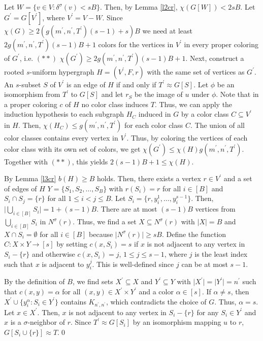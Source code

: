 \begin{prf}
Let $W=\{v\in V:\delta^\sigma (v) <sB\}$. Then, by Lemma \ref{l2cr}, $\chi (G[W]) < 2sB$. Let $G^\prime = G[V^\prime ]$, where $V^\prime = V-W$. Since $\chi (G)\geq 2(g(m^\prime ,n^\prime ,T^\prime )(s-1)+s)B$ we need at least $2g(m^\prime ,n^\prime ,T^\prime )(s-1)B + 1$ colors for the vertices in $V^\prime$ in every proper coloring of $G^\prime$, i.e. $(\ast\ast)$ $\chi (G^\prime )\geq 2g(m^\prime ,n^\prime ,T^\prime )(s-1)B + 1$. Next, construct a rooted $s$-uniform hypergraph $H=(V^\prime ,F,r)$ with the same set of vertices as $G^\prime$. An $s$-subset $S$ of $V^\prime$ is an edge of $H$ if and only if $T^\prime\approx G[S]$. Let $\phi$ be an isomorphism from $T^\prime$ to $G[S]$ and let $r_S$ be the image of $u$ under $\phi$. Note that in a proper coloring $c$ of $H$ no color class induces $T$. Thus, we can apply the induction hypothesis to each subgraph $H_C$ induced in $G$ by a color class $C\subseteq V^\prime$ in $H$. Then, $\chi (H_C)\leq g(m^\prime ,n^\prime ,T^\prime )$ for each color class $C$. The union of all color classes contains every vertex in $V^\prime$. Thus, by coloring the vertices of each color class with its own set of colors, we get $\chi (G^\prime )\leq \chi (H)g(m^\prime ,n^\prime ,T^\prime )$. Together with $(\ast\ast)$, this yields $2(s-1)B +1\leq \chi (H)$.

By Lemma \ref{l3cr} $b(H)\geq B$ holds. Then, there exists a vertex $r\in V^\prime$ and a set of edges of $H$ $Y = \{S_1,S_2,\dots ,S_B\}$ with $r(S_i)=r$ for all $i\in [B]$ and $S_i\cap S_j=\{r\}$ for all $1\leq i<j\leq B$. Let $S_i=\{r,y_i^1,\dots ,y_i^{s-1}\}$. Then, $\vert \bigcup_{i\in [B]} S_i\vert =1 +(s-1)B$. There are at most $(s-1)B$ vertices from $\bigcup_{i\in [B]} S_i$ in $N^\sigma (r)$. Thus, we find a set $X\subseteq N^\sigma (r)$ with $\vert X\vert =B$ and $X\cap S_i =\emptyset$ for all $i\in [B]$ because $\vert N^\sigma (r)\vert\geq sB$. Define the function $C:X\times Y\to [s]$ by setting $c(x,S_i)=s$ if $x$ is not adjacent to any vertex in $S_i-\{r\}$ and otherwise $c(x,S_i)=j$, $1\leq j\leq s-1$, where $j$ is the least index such that $x$ is adjacent to $y_i^j$. This is well-defined since $j$ can be at most $s-1$.

By the definition of $B$, we find sets $X^\prime\subseteq X$ and $Y^\prime\subseteq Y$ with $\vert X^\prime\vert = \vert Y^\prime\vert =n^\prime$ such that $c(x,y)=\alpha$ for all $(x,y)\in X^\prime\times Y^\prime$ and a color $\alpha\in [s]$. If $\alpha\neq s$, then $X^\prime\cup\{y_i^\alpha :S_i\in Y^\prime\}$ contains $K_{n^\prime ,n^\prime}$, which contradicts the choice of $G$. Thus, $\alpha = s$. Let $x\in X^\prime$. Then, $x$ is not adjacent to any vertex in $S_i - \{r\}$ for any $S_i\in Y^\prime$ and $x$ is a $\sigma$-neighbor of $r$. Since $T^\prime\approx G[S_i]$ by an isomorphism mapping $u$ to $r$, $G[S_i\cup\{r\}]\approx T$.\qed
\end{prf}

